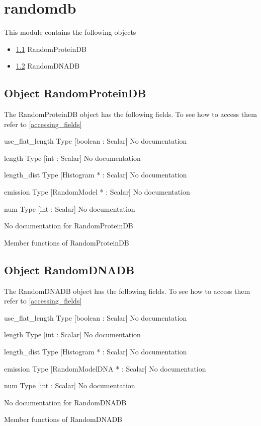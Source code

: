 \section{randomdb}
\label{module_randomdb}
This module contains the following objects

\begin{itemize}
\item \ref{object_RandomProteinDB} RandomProteinDB

\item \ref{object_RandomDNADB} RandomDNADB

\end{itemize}
\subsection{Object RandomProteinDB}

\label{object_RandomProteinDB}

The RandomProteinDB object has the following fields. To see how to access them refer to \ref{accessing_fields}
\begin{description}
\item{use_flat_length} Type [boolean : Scalar] No documentation

\item{length} Type [int : Scalar] No documentation

\item{length_dist} Type [Histogram * : Scalar] No documentation

\item{emission} Type [RandomModel * : Scalar] No documentation

\item{num} Type [int : Scalar] No documentation

\end{description}
No documentation for RandomProteinDB

Member functions of RandomProteinDB

\subsection{Object RandomDNADB}

\label{object_RandomDNADB}

The RandomDNADB object has the following fields. To see how to access them refer to \ref{accessing_fields}
\begin{description}
\item{use_flat_length} Type [boolean : Scalar] No documentation

\item{length} Type [int : Scalar] No documentation

\item{length_dist} Type [Histogram * : Scalar] No documentation

\item{emission} Type [RandomModelDNA * : Scalar] No documentation

\item{num} Type [int : Scalar] No documentation

\end{description}
No documentation for RandomDNADB

Member functions of RandomDNADB

